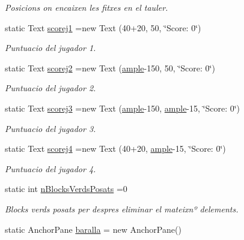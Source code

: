 \begin{DoxyCompactItemize}
\begin{DoxyCompactList}\small\item\em Posicions on encaixen les fitxes en el tauler. \end{DoxyCompactList}\item 
static Text \mbox{\hyperlink{class_gui_af2f35c2a3421b4d76fc232f854903312}{scorej1}} =new Text (40+20, 50, \char`\"{}Score\+: 0\char`\"{})
\begin{DoxyCompactList}\small\item\em Puntuacio del jugador 1. \end{DoxyCompactList}\item 
static Text \mbox{\hyperlink{class_gui_a2bb8d906be16f4e53c1aa393c1750608}{scorej2}} =new Text (\mbox{\hyperlink{class_gui_a872c30141e879159a1c3d9958918fecd}{ample}}-\/150, 50, \char`\"{}Score\+: 0\char`\"{})
\begin{DoxyCompactList}\small\item\em Puntuacio del jugador 2. \end{DoxyCompactList}\item 
static Text \mbox{\hyperlink{class_gui_a691917c172b8ab9888a4fbe6075c8c54}{scorej3}} =new Text (\mbox{\hyperlink{class_gui_a872c30141e879159a1c3d9958918fecd}{ample}}-\/150, \mbox{\hyperlink{class_gui_a872c30141e879159a1c3d9958918fecd}{ample}}-\/15, \char`\"{}Score\+: 0\char`\"{})
\begin{DoxyCompactList}\small\item\em Puntuacio del jugador 3. \end{DoxyCompactList}\item 
static Text \mbox{\hyperlink{class_gui_ad8a03b9034810c4c580403c2c1efa1b7}{scorej4}} =new Text (40+20, \mbox{\hyperlink{class_gui_a872c30141e879159a1c3d9958918fecd}{ample}}-\/15, \char`\"{}Score\+: 0\char`\"{})
\begin{DoxyCompactList}\small\item\em Puntuacio del jugador 4. \end{DoxyCompactList}\item 
static int \mbox{\hyperlink{class_gui_aadfe303c299579e97ce672d60a7f1cdb}{n\+Blocks\+Verds\+Posats}} =0
\begin{DoxyCompactList}\small\item\em Blocks verds posats per despres eliminar el mateixnº d\textquotesingle{}elements. \end{DoxyCompactList}\item 
static Anchor\+Pane \mbox{\hyperlink{class_gui_a6f0b7608a67268ba19c503871178428e}{baralla}} = new Anchor\+Pane()

\end{DoxyCompactItemize}

